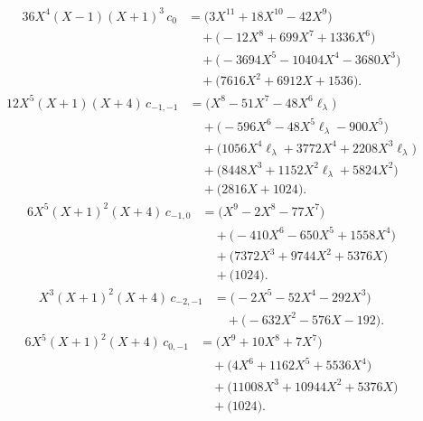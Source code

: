 \begin{equation}
\begin{aligned}
36 X^{4} \left(X - 1\right) \left(X + 1\right)^{3}\,c_{0}&={}\bigl(3 X^{11} + 18 X^{10} - 42 X^{9}\bigr)\\
&\quad{}+\bigl(- 12 X^{8} + 699 X^{7} + 1336 X^{6}\bigr)\\
&\quad{}+\bigl(- 3694 X^{5} - 10404 X^{4} - 3680 X^{3}\bigr)\\
&\quad{}+\bigl(7616 X^{2} + 6912 X + 1536\bigr).
\end{aligned}
\end{equation}
\begin{equation}
\begin{aligned}
12 X^{5} \left(X + 1\right) \left(X + 4\right)\,c_{-1,-1}&={}\bigl(X^{8} - 51 X^{7} - 48 X^{6} \ell_\lambda\bigr)\\
&\quad{}+\bigl(- 596 X^{6} - 48 X^{5} \ell_\lambda - 900 X^{5}\bigr)\\
&\quad{}+\bigl(1056 X^{4} \ell_\lambda + 3772 X^{4} + 2208 X^{3} \ell_\lambda\bigr)\\
&\quad{}+\bigl(8448 X^{3} + 1152 X^{2} \ell_\lambda + 5824 X^{2}\bigr)\\
&\quad{}+\bigl(2816 X + 1024\bigr).
\end{aligned}
\end{equation}
\begin{equation}
\begin{aligned}
6 X^{5} \left(X + 1\right)^{2} \left(X + 4\right)\,c_{-1,0}&={}\bigl(X^{9} - 2 X^{8} - 77 X^{7}\bigr)\\
&\quad{}+\bigl(- 410 X^{6} - 650 X^{5} + 1558 X^{4}\bigr)\\
&\quad{}+\bigl(7372 X^{3} + 9744 X^{2} + 5376 X\bigr)\\
&\quad{}+\bigl(1024\bigr).
\end{aligned}
\end{equation}
\begin{equation}
\begin{aligned}
X^{3} \left(X + 1\right)^{2} \left(X + 4\right)\,c_{-2,-1}&={}\bigl(- 2 X^{5} - 52 X^{4} - 292 X^{3}\bigr)\\
&\quad{}+\bigl(- 632 X^{2} - 576 X - 192\bigr).
\end{aligned}
\end{equation}
\begin{equation}
\begin{aligned}
6 X^{5} \left(X + 1\right)^{2} \left(X + 4\right)\,c_{0,-1}&={}\bigl(X^{9} + 10 X^{8} + 7 X^{7}\bigr)\\
&\quad{}+\bigl(4 X^{6} + 1162 X^{5} + 5536 X^{4}\bigr)\\
&\quad{}+\bigl(11008 X^{3} + 10944 X^{2} + 5376 X\bigr)\\
&\quad{}+\bigl(1024\bigr).
\end{aligned}
\end{equation}

